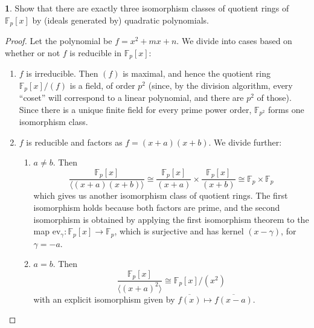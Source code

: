 \documentclass{book}
\newcommand{\F}{\mathbb F}
\theoremstyle{definition}
\theoremstyle{block}
\newtheorem{block*}[block]{}
\theoremstyle{thm}
\begin{document}
\begin{block*}
  Show that there are exactly three isomorphism classes of quotient rings of
  $\F_p[x]$ by (ideals generated by) quadratic polynomials.
\end{block*}

\begin{proof}
  Let the polynomial be $f = x^2+mx+n$. We divide into cases based on whether or not
  $f$ is reducible in $\F_p[x]$:
  \begin{enumerate}
    \item $f$ is irreducible. Then $(f)$ is maximal, and hence the quotient ring
      $\F_p[x]/(f)$ is a field, of order $p^2$ (since, by the division
      algorithm, every ``coset'' will correspond to a linear polynomial, and there
      are $p^2$ of those). Since there is a unique finite field for every prime
      power order, $\F_{p^2}$ forms one isomorphism class.
    \item $f$ is reducible and factors as $f = (x+a)(x+b)$. We divide further:
      \begin{enumerate}
        \item $a \neq b$. Then
          \[\frac{\F_p[x]}{\langle {(x+a)(x+b)} \rangle} \cong
            \frac{\F_p[x]}{(x+a)}\times\frac{\F_p[x]}{(x+b)} \cong
            \F_p\times\F_p\]
          which gives us another isomorphism class of quotient rings.
          The first isomorphism holds because both factors are prime, and the
          second isomorphism is obtained by applying the first isomorphism
          theorem to the map $\text{ev}_{\gamma}:\F_p[x]\to\F_p$, which is surjective
          and has kernel $(x-\gamma)$, for $\gamma = -a$.
        \item $a = b$. Then
          \[\frac{\F_p[x]}{\langle (x+a)^2 \rangle}\cong \F_p[x]/(x^2)
          \]
          with an explicit isomorphism given by $\overline{f(x)}\mapsto
          \overline{f(x-a)}$. 
      \end{enumerate}
  \end{enumerate}
\end{proof}
\end{document}
